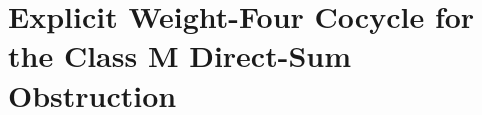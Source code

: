 
\chapter{Explicit Weight-Four Cocycle for the Class M Direct-Sum
Obstruction}
\label{ch:class-m-direct-sum-obstruction-platonic}

